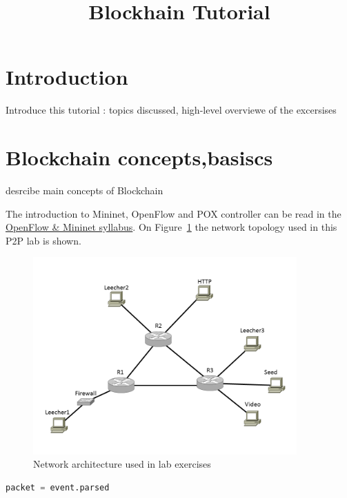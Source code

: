 \documentclass[a4paper]{article}
\title{Blockhain Tutorial}
\author{}
\date{}
\begin{document}
\maketitle

\tableofcontents

\section{Introduction}

Introduce this tutorial : topics discussed, high-level overviewe of the excersises

\section{Blockchain concepts,basiscs}

desrcibe main concepts of Blockchain 

The introduction to Mininet, OpenFlow and POX controller can be read in the
\href{https://qosip.tmit.bme.hu/foswiki/pub/Meres/OpenFlowMSc/OpenFlow-Mininet-syllabus-en.pdf}{OpenFlow \& Mininet
    syllabus}. On
Figure~\ref{fig:Lab-topo} the network topology used in this P2P lab is shown.

\begin{figure}[H]
    \centering
    \includegraphics[width=0.9\textwidth]{figures/halozat.png}
    \caption{Network architecture used in lab exercises}
    \label{fig:Lab-topo}
\end{figure}

\begin{lstlisting}[language=python,frame=single,breaklines]
packet = event.parsed  
\end{lstlisting}
\end{document}
